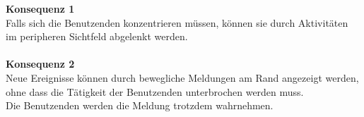 
%
\textbf{Konsequenz 1} \\
Falls sich die Benutzenden konzentrieren müssen, können sie durch Aktivitäten im peripheren Sichtfeld
abgelenkt werden.
\\\\
\textbf{Konsequenz 2}\\
Neue Ereignisse können durch bewegliche Meldungen am Rand angezeigt werden,
ohne dass die Tätigkeit der Benutzenden unterbrochen werden muss. 
\\
Die Benutzenden werden die Meldung trotzdem wahrnehmen.
